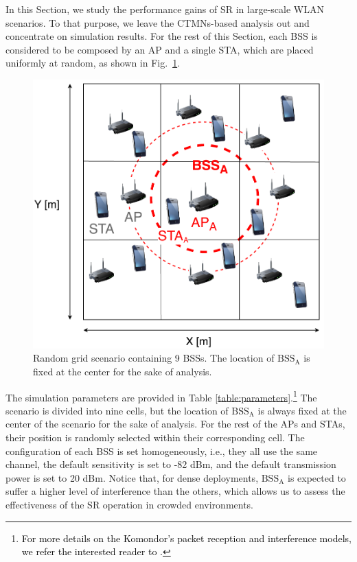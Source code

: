 \documentclass{ieeeaccess}
\begin{document}
In this Section, we study the performance gains of SR in large-scale WLAN scenarios. To that purpose, we leave the CTMNs-based analysis out and concentrate on simulation results. For the rest of this Section, each BSS is considered to be composed by an AP and a single STA, which are placed uniformly at random, as shown in Fig.~\ref{fig:random_scenario}. 

\begin{figure}[ht!]
	\centering
	\includegraphics[width=0.8\columnwidth]{random_scenario}
	\caption{Random grid scenario containing 9 BSSs. The location of $\text{BSS}_\text{A}$ is fixed at the center for the sake of analysis.}
	\label{fig:random_scenario}
\end{figure}

The simulation parameters are provided in Table \ref{table:parameters}.\footnote{\textcolor{black}{For more details on the Komondor's packet reception and interference models, we refer the interested reader to \cite{barrachina2019komondor}.}} The scenario is divided into nine cells, but the location of $\text{BSS}_\text{A}$ is always fixed at the center of the scenario for the sake of analysis. For the rest of the APs and STAs, their position is randomly selected within their corresponding cell. The configuration of each BSS is set homogeneously, i.e., they all use the same channel, the default sensitivity is set to -82 dBm, and the default transmission power is set to 20 dBm. Notice that, for dense deployments, $\text{BSS}_\text{A}$ is expected to suffer a higher level of interference than the others, which allows us to assess the effectiveness of the SR operation in crowded environments.
\end{document}
